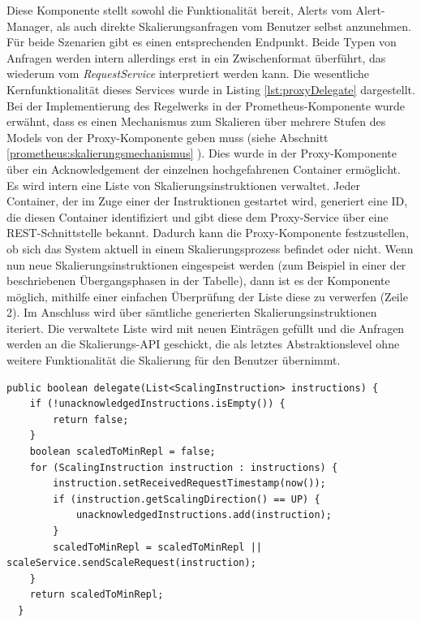 Diese Komponente stellt sowohl die Funktionalität bereit, Alerts vom Alert-Manager, als auch direkte Skalierungsanfragen vom Benutzer selbst anzunehmen. Für beide Szenarien gibt es einen entsprechenden Endpunkt. Beide Typen von Anfragen werden intern allerdings erst in ein Zwischenformat überführt, das wiederum vom \emph{RequestService} interpretiert werden kann. Die wesentliche Kernfunktionalität dieses Services wurde in Listing \ref{lst:proxyDelegate}  dargestellt. Bei der Implementierung des Regelwerks in der Prometheus-Komponente wurde erwähnt, dass es einen Mechanismus zum Skalieren über mehrere Stufen des Models von der Proxy-Komponente geben muss (siehe Abschnitt \ref{prometheus:skalierungsmechanismus} ). Dies wurde in der Proxy-Komponente über ein Acknowledgement der einzelnen hochgefahrenen Container ermöglicht. Es wird intern eine Liste von Skalierungsinstruktionen verwaltet. Jeder Container, der im Zuge einer der Instruktionen gestartet wird, generiert eine ID, die diesen Container identifiziert und gibt diese dem Proxy-Service über eine REST-Schnittstelle bekannt. Dadurch kann die Proxy-Komponente festzustellen, ob sich das System aktuell in einem Skalierungsprozess befindet oder nicht. Wenn nun neue Skalierungsinstruktionen eingespeist werden (zum Beispiel in einer der beschriebenen Übergangsphasen in der Tabelle), dann ist es der Komponente möglich, mithilfe einer einfachen Überprüfung der Liste diese zu verwerfen (Zeile 2). Im Anschluss wird über sämtliche generierten Skalierungsinstruktionen iteriert. Die verwaltete Liste wird mit neuen Einträgen gefüllt und die Anfragen werden an die Skalierungs-API geschickt, die als letztes Abstraktionslevel ohne weitere Funktionalität die Skalierung für den Benutzer übernimmt. 

\begin{minipage}{\linewidth}
\begin{lstlisting}[style=javaStyle,caption={Proxy Scaler -- RequestService},label=lst:proxyDelegate]
  public boolean delegate(List<ScalingInstruction> instructions) {
    if (!unacknowledgedInstructions.isEmpty()) {
        return false;
    }
    boolean scaledToMinRepl = false;
    for (ScalingInstruction instruction : instructions) {
        instruction.setReceivedRequestTimestamp(now());
        if (instruction.getScalingDirection() == UP) {
            unacknowledgedInstructions.add(instruction);
        }
        scaledToMinRepl = scaledToMinRepl || scaleService.sendScaleRequest(instruction);
    }
    return scaledToMinRepl;
  }
\end{lstlisting}
\end{minipage}

